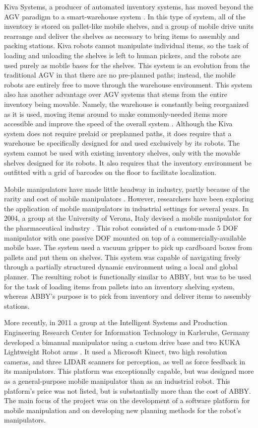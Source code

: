 \documentclass[]{cwru} %
\begin{document}
Kiva Systems, a producer of automated inventory systems, has moved
beyond the AGV paradigm to a smart-warehouse system \cite{kiva}. In this type
of system, all of the inventory is stored on pallet-like mobile shelves,
and a group of mobile drive units rearrange and deliver the shelves as
necessary to bring items to assembly and packing stations. Kiva robots
cannot manipulate individual items, so the task of loading and unloading
the shelves is left to human pickers, and the robots are used purely as
mobile bases for the shelves. This system is an evolution from the
traditional AGV in that there are no pre-planned paths; instead, the
mobile robots are entirely free to move through the warehouse
environment. This system also has another advantage over AGV systems
that stems from the entire inventory being movable. Namely, the
warehouse is constantly being reorganized as it is used, moving items
around to make commonly-needed items more accessible and improve the
speed of the overall system \cite{dandrea}. Although the Kiva system does not
require prelaid or preplanned paths, it does require that a warehouse be
specifically designed for and used exclusively by its robots. The system
cannot be used with existing inventory shelves, only with the movable
shelves designed for its robots. It also requires that the inventory
environment be outfitted with a grid of barcodes on the floor to
facilitate localization.

Mobile manipulators have made little headway in industry, partly because
of the rarity and cost of mobile manipulators \cite{bischoff}. However,
researchers have been exploring the application of mobile manipulators
in industrial settings for several years. In 2004, a group at the
University of Verona, Italy devised a mobile manipulator for the
pharmaceutical industry \cite{cosma}. This robot consisted of a custom-made 5
DOF manipulator with one passive DOF mounted on top of a
commercially-available mobile base. The system used a vacuum gripper to
pick up cardboard boxes from pallets and put them on shelves. This
system was capable of navigating freely through a partially structured
dynamic environment using a local and global planner. The resulting
robot is functionally similar to ABBY, but was to be used for the task
of loading items from pallets into an inventory shelving system, whereas
ABBY's purpose is to pick from inventory and deliver items to assembly
stations.

More recently, in 2011 a group at the Intelligent Systems and Production
Engineering Research Center for Information Technology in Karlsruhe,
Germany developed a bimanual manipulator using a custom drive base and
two KUKA Lightweight Robot arms \cite{hermann}. It used a Microsoft Kinect, two
high resolution cameras, and three LIDAR scanners for perception, as
well as force feedback in its manipulators. This platform was
exceptionally capable, but was designed more as a general-purpose mobile
manipulator than as an industrial robot. This platform's price was not
listed, but is substantially more than the cost of ABBY. The main focus
of the project was on the development of a software platform for mobile
manipulation and on developing new planning methods for the robot's
manipulators.
\end{document}
